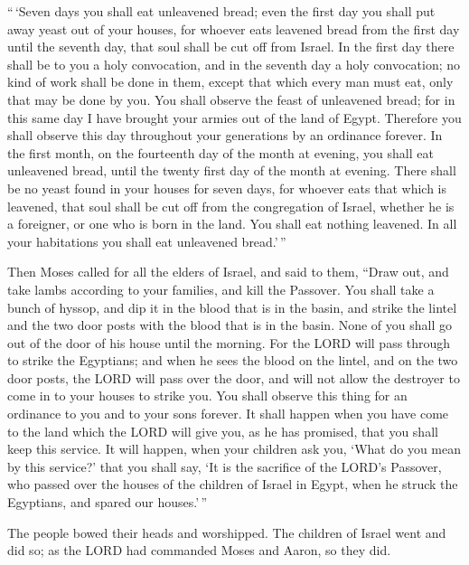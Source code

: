  ``\,`Seven days you shall eat unleavened bread; even the
first day you shall put away yeast out of your houses, for whoever eats
leavened bread from the first day until the seventh day, that soul shall
be cut off from Israel.  In the first day there shall be
to you a holy convocation, and in the seventh day a holy convocation; no
kind of work shall be done in them, except that which every man must
eat, only that may be done by you.  You shall observe the
feast of unleavened bread; for in this same day I have brought your
armies out of the land of Egypt. Therefore you shall observe this day
throughout your generations by an ordinance forever.  In
the first month, on the fourteenth day of the month at evening, you
shall eat unleavened bread, until the twenty first day of the month at
evening.  There shall be no yeast found in your houses
for seven days, for whoever eats that which is leavened, that soul shall
be cut off from the congregation of Israel, whether he is a foreigner,
or one who is born in the land.  You shall eat nothing
leavened. In all your habitations you shall eat unleavened bread.'\,''

 Then Moses called for all the elders of Israel, and said
to them, ``Draw out, and take lambs according to your families, and kill
the Passover.  You shall take a bunch of hyssop, and dip
it in the blood that is in the basin, and strike the lintel and the two
door posts with the blood that is in the basin. None of you shall go out
of the door of his house until the morning.  For the LORD
will pass through to strike the Egyptians; and when he sees the blood on
the lintel, and on the two door posts, the LORD will pass over the door,
and will not allow the destroyer to come in to your houses to strike
you.  You shall observe this thing for an ordinance to
you and to your sons forever.  It shall happen when you
have come to the land which the LORD will give you, as he has promised,
that you shall keep this service.  It will happen, when
your children ask you, `What do you mean by this service?'
 that you shall say, `It is the sacrifice of the LORD's
Passover, who passed over the houses of the children of Israel in Egypt,
when he struck the Egyptians, and spared our houses.'\,''

The people bowed their heads and worshipped.  The
children of Israel went and did so; as the LORD had commanded Moses and
Aaron, so they did.

